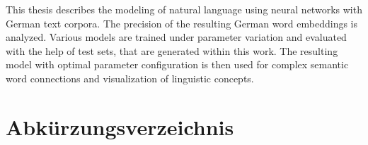 This thesis describes the modeling of natural language using neural networks with German text corpora. The precision of the resulting German word embeddings is analyzed. Various models are trained under parameter variation and evaluated with the help of test sets, that are generated within this work. The resulting model with optimal parameter configuration is then used for complex semantic word connections and visualization of linguistic concepts.


\tableofcontents
\listoffigures
\listoftables

\chapter*{Abkürzungsverzeichnis}\label{s.abbr}
\begin{acronym}[----------------]
\end{acronym}


